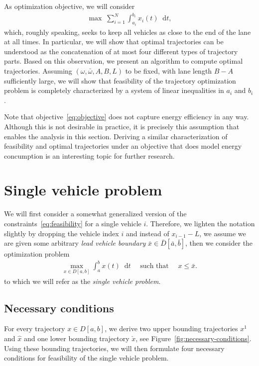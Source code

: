 \documentclass[a4paper]{article}
\theoremstyle{definition}
\theoremstyle{plain}
\newcommand*\diff{\mathop{}\!\mathrm{d}}
\begin{document}
As optimization objective, we will consider
\begin{align}\label{eq:objective}
  \max \; \sum_{i=1}^{N} \int_{a_{i}}^{b_{i}} x_{i}(t) \diff t ,
\end{align}
which, roughly speaking, seeks to keep all vehicles as close to the end of the
lane at all times.
%
In particular, we will show that optimal trajectories can be understood as the
concatenation of at most four different types of trajectory parts. Based on this
observation, we present an algorithm to compute optimal trajectories.
%
Assuming $(\omega, \bar{\omega},A,B,L)$ to be fixed, with lane length $B-A$
sufficiently large, we will show that feasibility of the trajectory optimization
problem is completely characterized by a system of linear inequalities in
$a_{i}$ and $b_{i}$.

Note that objective~\eqref{eq:objective} does not capture energy efficiency in
any way. Although this is not desirable in practice, it is precisely this
assumption that enables the analysis in this section. Deriving a similar
characterization of feasibility and optimal trajectories under an objective that
does model energy concumption is an interesting topic for further research.

\section{Single vehicle problem}

We will first consider a somewhat generalized version of the
constraints~\eqref{eq:feasibility} for a single vehicle $i$. Therefore, we
lighten the notation slightly by dropping the vehicle index $i$ and instead of
$x_{i-1} - L$, we assume we are given some arbitrary \emph{lead vehicle
  boundary} $\bar{x} \in \bar{D}[\bar{a}, \bar{b}]$, then we consider the
optimization problem
\begin{align}
  \max_{x \in D[a, b]} \int_{a}^{b} x(t) \diff t \quad \text{ such that } \quad x \leq \bar{x} .
\end{align}
to which we will refer as the \emph{single vehicle problem}.

\subsection{Necessary conditions}

For every trajectory $x \in D[a,b]$, we derive two upper
bounding trajectories $x^{1}$ and $\hat{x}$ and one lower bounding trajectory
$\check{x}$, see Figure~\ref{fig:necessary-conditions}.
%
Using these bounding trajectories, we will then formulate four necessary
conditions for feasibility of the single vehicle problem.
\end{document}
